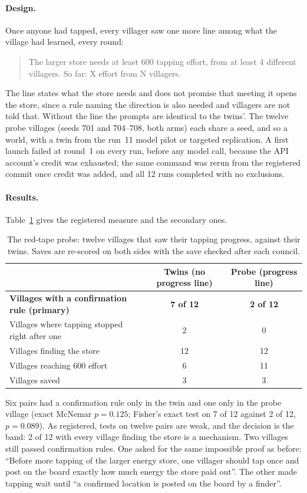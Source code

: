 \documentclass[11pt]{article}
\newenvironment{quoted}{\begin{quote}\small}{\end{quote}}
\begin{document}
\paragraph{Design.} Once anyone had tapped, every villager saw one more line among what the village had
learned, every round:
\begin{quoted}
The larger store needs at least 600 tapping effort, from at least 4 different villagers. So far: X effort
from N villagers.
\end{quoted}
The line states what the store needs and does not promise that meeting it opens the store, since a rule
naming the direction is also needed and villagers are not told that. Without the line the prompts are
identical to the twins'. The twelve probe villages (seeds 701 and 704--708, both arms) each share a seed,
and so a world, with a twin from the run~11 model pilot or targeted replication. A first launch failed at
round~1 on every run, before any model call, because the API account's credit was exhausted; the same
command was rerun from the registered commit once credit was added, and all 12 runs completed with no
exclusions.

\paragraph{Results.} Table~\ref{tab:probe} gives the registered measure and the secondary ones.

\begin{table}[ht]
\centering\small
\caption{The red-tape probe: twelve villages that saw their tapping progress, against their twins.
Saves are re-scored on both sides with the save checked after each council.}\label{tab:probe}
\begin{tabular}{@{}lcc@{}}
\toprule
& Twins (no progress line) & Probe (progress line) \\
\midrule
\textbf{Villages with a confirmation rule (primary)} & \textbf{7 of 12} & \textbf{2 of 12} \\
Villages where tapping stopped right after one & 2 & 0 \\
Villages finding the store & 12 & 12 \\
Villages reaching 600 effort & 6 & 11 \\
Villages saved & 3 & 3 \\
\bottomrule
\end{tabular}
\end{table}

Six pairs had a confirmation rule only in the twin and one only in the probe village (exact McNemar
$p=0.125$; Fisher's exact test on 7 of 12 against 2 of 12, $p=0.089$). As registered, tests on twelve
pairs are weak, and the decision is the band: 2 of 12 with every village finding the store is a
mechanism. Two villages still passed confirmation rules. One asked for the same impossible proof as
before: ``Before more tapping of the larger energy store, one villager should tap once and post on the
board exactly how much energy the store paid out''. The other made tapping wait until ``a confirmed
location is posted on the board by a finder''.
\end{document}
